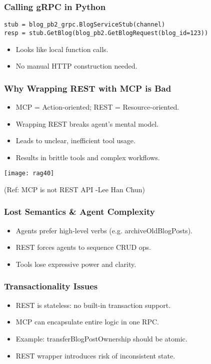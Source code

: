 \begin{frame}[fragile]\frametitle{Calling gRPC in Python}
\begin{lstlisting}
stub = blog_pb2_grpc.BlogServiceStub(channel)
resp = stub.GetBlog(blog_pb2.GetBlogRequest(blog_id=123))
\end{lstlisting}
\begin{itemize}
  \item Looks like local function calls.
  \item No manual HTTP construction needed.
\end{itemize}
\end{frame}

\begin{frame}[fragile]\frametitle{Why Wrapping REST with MCP is Bad}
\begin{itemize}
  \item MCP = Action-oriented; REST = Resource-oriented.
  \item Wrapping REST breaks agent's mental model.
  \item Leads to unclear, inefficient tool usage.
  \item Results in brittle tools and complex workflows.
\end{itemize}

	\begin{center}
	\texttt{[image: rag40]}

	{\tiny (Ref: MCP is not REST API -Lee Han Chun)}
	\end{center}
\end{frame}

\begin{frame}[fragile]\frametitle{Lost Semantics \& Agent Complexity}
\begin{itemize}
  \item Agents prefer high-level verbs (e.g. archiveOldBlogPosts).
  \item REST forces agents to sequence CRUD ops.
  \item Tools lose expressive power and clarity.
\end{itemize}
\end{frame}

\begin{frame}[fragile]\frametitle{Transactionality Issues}
\begin{itemize}
  \item REST is stateless: no built-in transaction support.
  \item MCP can encapsulate entire logic in one RPC.
  \item Example: transferBlogPostOwnership should be atomic.
  \item REST wrapper introduces risk of inconsistent state.
\end{itemize}
\end{frame}

